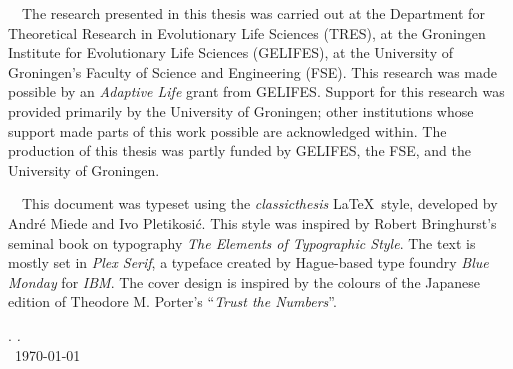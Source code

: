 \thispagestyle{empty}

\hfill

\vfill


\noindent \adftripleflourishright~~The research presented in this thesis was carried out at the Department for Theoretical Research in Evolutionary Life Sciences (TRES), at the Groningen Institute for Evolutionary Life Sciences (GELIFES), at the University of Groningen's Faculty of Science and Engineering (FSE).
This research was made possible by an \emph{Adaptive Life} grant from GELIFES.
Support for this research was provided primarily by the University of Groningen; other institutions whose support made parts of this work possible are acknowledged within.
The production of this thesis was partly funded by GELIFES, the FSE, and the University of Groningen.

\medskip

\noindent \adftripleflourishright~~This document was typeset using the \emph{classicthesis} \LaTeX~style, developed by Andr\'e Miede and Ivo Pletikosić.
This style was inspired by Robert Bringhurst's seminal book on typography \emph{The Elements of Typographic Style}.
The text is mostly set in \emph{Plex Serif}, a typeface created by Hague-based type foundry \emph{Blue Monday} for \emph{IBM}.
The cover design is inspired by the colours of the Japanese edition of Theodore M. Porter's ``\emph{Trust the Numbers}''.

\bigskip

\noindent\finalVersionString

\noindent\myName. \textit{\myTitle.}%
\\
\noindent \textcopyright\ \today
